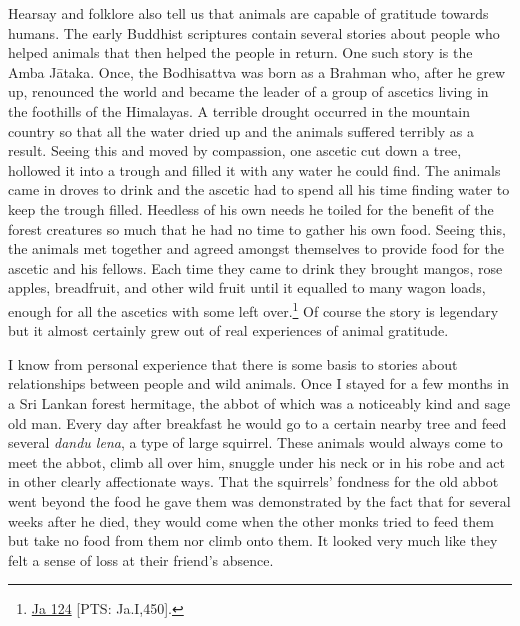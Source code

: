 \documentclass[10pt, openright]{book}
\begin{document}
Hearsay and folklore also tell us that animals are capable of gratitude towards humans. The early Buddhist scriptures contain several stories about people who helped animals that then helped the people in return. One such story is the Amba Jātaka. Once, the Bodhisattva was born as a Brahman who, after he grew up, renounced the world and became the leader of a group of ascetics living in the foothills of the Himalayas. A terrible drought occurred in the mountain country so that all the water dried up and the animals suffered terribly as a result. Seeing this and moved by compassion, one ascetic cut down a tree, hollowed it into a trough and filled it with any water he could find. The animals came in droves to drink and the ascetic had to spend all his time finding water to keep the trough filled. Heedless of his own needs he toiled for the benefit of the forest creatures so much that he had no time to gather his own food. Seeing this, the animals met together and agreed amongst themselves to provide food for the ascetic and his fellows. Each time they came to drink they brought mangos, rose apples, breadfruit, and other wild fruit until it equalled to many wagon loads, enough for all the ascetics with some left over.\footnote {\href{https://suttacentral.net/ja124/en/chalmers}{Ja 124} [PTS: Ja.I,450].} Of course the story is legendary but it almost certainly grew out of real experiences of animal gratitude.


I know from personal experience that there is some basis to stories about relationships between people and wild animals. Once I stayed for a few months in a Sri Lankan forest hermitage, the abbot of which was a noticeably kind and sage old man. Every day after breakfast he would go to a certain nearby tree and feed several \textit{dandu lena}, a type of large squirrel. These animals would always come to meet the abbot, climb all over him, snuggle under his neck or in his robe and act in other clearly affectionate ways. That the squirrels’ fondness for the old abbot went beyond the food he gave them was demonstrated by the fact that for several weeks after he died, they would come when the other monks tried to feed them but take no food from them nor climb onto them. It looked very much like they felt a sense of loss at their friend’s absence.
\end{document}
